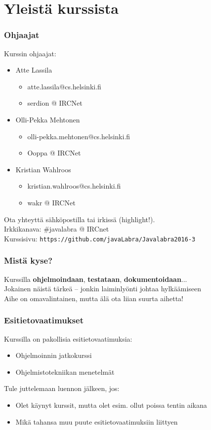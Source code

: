 \documentclass[finnish]{beamer}
\institute{Helsingin Yliopisto, TKTL}
\author{Atte Lassila, Olli-Pekka Mehtonen, Kristian Wahlroos}
\date{18. tammikuuta - 04. maaliskuuta}
\begin{document}
	\frame{\titlepage}
	
	\section{Yleistä kurssista}
	
	\begin{frame}
		\frametitle{Ohjaajat}
		
		Kurssin ohjaajat:
		\begin{itemize}
			\item Atte Lassila
			\begin{itemize}
				\item atte.lassila@cs.helsinki.fi
				\item serdion @ IRCNet
			\end{itemize}
			\item Olli-Pekka Mehtonen
			\begin{itemize}
				\item olli-pekka.mehtonen@cs.helsinki.fi
				\item Ooppa @ IRCNet
			\end{itemize}
			\item Kristian Wahlroos
			\begin{itemize}
				\item kristian.wahlroos@cs.helsinki.fi
				\item wakr @ IRCNet
			\end{itemize}
		\end{itemize}
		
		Ota yhteyttä sähköpostilla tai irkissä (highlight!). \\
		Irkkikanava: \#javalabra @ IRCnet \\
		Kurssisivu: \texttt{https://github.com/javaLabra/Javalabra2016-3}
	\end{frame}
	
	\begin{frame}
		\frametitle{Mistä kyse?}

		Kurssilla \textbf{ohjelmoindaan}, \textbf{testataan}, \textbf{dokumentoidaan}... \\
		Jokainen näistä tärkeä -- jonkin laiminlyönti johtaa hylkäämiseen \\
		Aihe on omavalintainen, mutta älä ota liian suurta aihetta!
	\end{frame}
	
	\begin{frame}
		\frametitle{Esitietovaatimukset}
		
		Kurssilla on pakollisia esitietovaatimuksia:
		\begin{itemize}
			\item Ohjelmoinnin jatkokurssi
			\item Ohjelmistotekniikan menetelmät
		\end{itemize}
		
		Tule juttelemaan luennon jälkeen, jos: 
		\begin{itemize}
			\item Olet käynyt kurssit, mutta olet esim. ollut poissa tentin aikana
			\item Mikä tahansa muu puute esitietovaatimuksiin liittyen
		\end{itemize}
	\end{frame}
	
\end{document}
